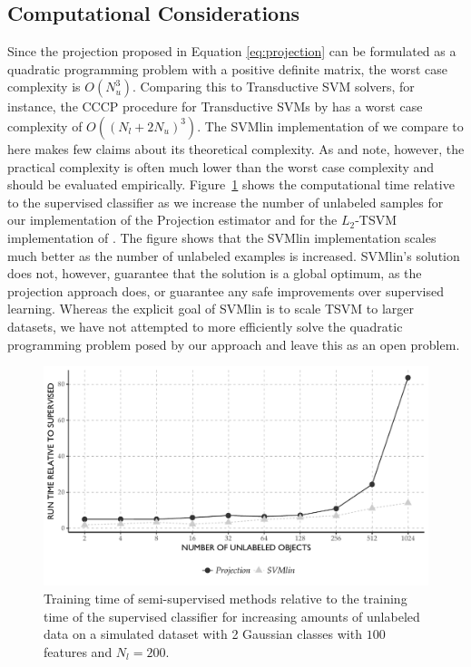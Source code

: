 \documentclass[twoside]{memoir}\usepackage[]{graphicx}\usepackage{xcolor}
\makeatletter
\def\maxwidth{ %
  \ifdim\Gin@nat@width>\linewidth
    \linewidth
  \else
    \Gin@nat@width
  \fi
}
\newenvironment{knitrout}{}{} %
\renewcommand{\cite}{\citep}
\makeatother
\begin{document}
\subsection{Computational Considerations}
Since the projection proposed in Equation \eqref{eq:projection} can be formulated as a quadratic programming problem with a positive definite matrix, the worst case complexity is $O(N_u^3)$. Comparing this to Transductive SVM solvers, for instance, the CCCP procedure for Transductive SVMs by \cite{Collobert2006} has a worst case complexity of $O((N_l+2N_u)^3)$. The SVMlin implementation of \citet{Sindhwani2006} we compare to here makes few claims about its theoretical complexity. As \citet{Collobert2006} and \citet{Sindhwani2006} note, however, the practical complexity is often much lower than the worst case complexity and should be evaluated empirically. Figure~\ref{fig:timecomplexity} shows the computational time relative to the supervised classifier as we increase the number of unlabeled samples for our implementation of the Projection estimator and for the $L_2$-TSVM implementation of \citet{Sindhwani2006}. The figure shows that the SVMlin implementation scales much better as the number of unlabeled examples is increased. SVMlin's solution does not, however, guarantee that the solution is a global optimum, as the projection approach does, or guarantee any safe improvements over supervised learning. Whereas the explicit goal of SVMlin is to scale TSVM to larger datasets, we have not attempted to more efficiently solve the quadratic programming problem posed by our approach and leave this as an open problem.

\begin{knitrout}
\color{fgcolor}\begin{figure}
\includegraphics[width=\maxwidth]{figure/timecomplexity-1} \caption[Training time of semi-supervised methods relative to the training time of the supervised classifier for increasing amounts of unlabeled data on a simulated dataset with 2 Gaussian classes with $100$ features and $N_l=200$]{Training time of semi-supervised methods relative to the training time of the supervised classifier for increasing amounts of unlabeled data on a simulated dataset with 2 Gaussian classes with $100$ features and $N_l=200$.}\label{fig:timecomplexity}
\end{figure}


\end{knitrout}
\end{document}

